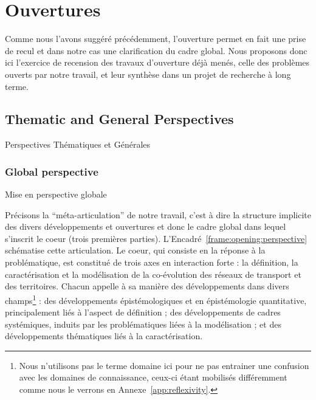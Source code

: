 


\chapter*{Ouvertures}

\label{ch:opening}




Comme nous l'avons suggéré précédemment, l'ouverture permet en fait une prise de recul et dans notre cas une clarification du cadre global. Nous proposons donc ici l'exercice de recension des travaux d'ouverture déjà menés, celle des problèmes ouverts par notre travail, et leur synthèse dans un projet de recherche à long terme.


\section*{Thematic and General Perspectives}{Perspectives Thématiques et Générales}



\subsection*{Global perspective}{Mise en perspective globale}


Précisons la ``méta-articulation'' de notre travail, c'est à dire la structure implicite des divers développements et ouvertures et donc le cadre global dans lequel s'inscrit le coeur (trois premières parties). L'Encadré~\ref{frame:opening:perspective} schématise cette articulation. Le coeur, qui consiste en la réponse à la problématique, est constitué de trois axes en interaction forte : la définition, la caractérisation et la modélisation de la co-évolution des réseaux de transport et des territoires. Chacun appelle à sa manière des développements dans divers champs\footnote{Nous n'utilisons pas le terme domaine ici pour ne pas entrainer une confusion avec les domaines de connaissance, ceux-ci étant mobilisés différemment comme nous le verrons en Annexe~\ref{app:reflexivity}.} : des développements épistémologiques et en épistémologie quantitative, principalement liés à l'aspect de définition ; des développements de cadres systémiques, induits par les problématiques liées à la modélisation ; et des développements thématiques liés à la caractérisation.


